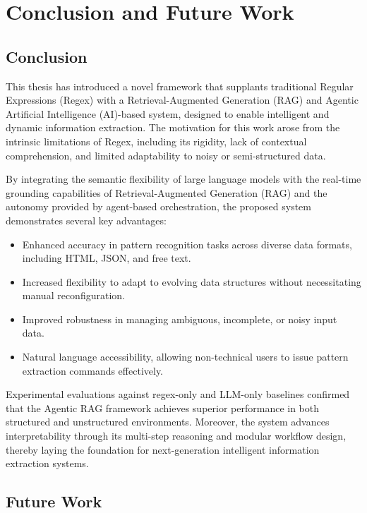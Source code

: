 \chapter{Conclusion and Future Work}
\section{Conclusion}

{\Large This} thesis has introduced a novel framework that supplants traditional Regular Expressions (Regex) with a Retrieval-Augmented Generation (RAG) and Agentic Artificial Intelligence (AI)-based system, designed to enable intelligent and dynamic information extraction. The motivation for this work arose from the intrinsic limitations of Regex, including its rigidity, lack of contextual comprehension, and limited adaptability to noisy or semi-structured data.

By integrating the semantic flexibility of large language models with the real-time grounding capabilities of Retrieval-Augmented Generation (RAG) and the autonomy provided by agent-based orchestration, the proposed system demonstrates several key advantages:

\begin{itemize}
    \item Enhanced accuracy in pattern recognition tasks across diverse data formats, including HTML, JSON, and free text.
    \item Increased flexibility to adapt to evolving data structures without necessitating manual reconfiguration.
    \item Improved robustness in managing ambiguous, incomplete, or noisy input data.
    \item Natural language accessibility, allowing non-technical users to issue pattern extraction commands effectively.
\end{itemize}

Experimental evaluations against regex-only and LLM-only baselines confirmed that the Agentic RAG framework achieves superior performance in both structured and unstructured environments. Moreover, the system advances interpretability through its multi-step reasoning and modular workflow design, thereby laying the foundation for next-generation intelligent information extraction systems.


\section{Future Work}

